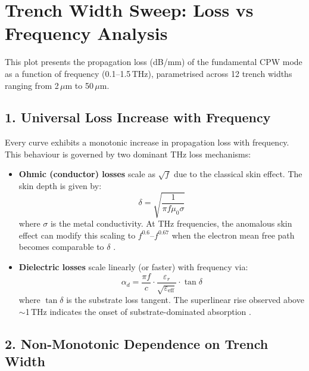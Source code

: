 
\section*{Trench Width Sweep: Loss vs Frequency Analysis}

This plot presents the propagation loss (dB/mm) of the fundamental CPW mode as a function of frequency (0.1--1.5\,THz), parametrised across 12 trench widths ranging from 2\,$\mu$m to 50\,$\mu$m.

\subsection*{1. Universal Loss Increase with Frequency}

Every curve exhibits a monotonic increase in propagation loss with frequency. This behaviour is governed by two dominant THz loss mechanisms:

\begin{itemize}
    \item \textbf{Ohmic (conductor) losses} scale as $\sqrt{f}$ due to the classical skin effect. The skin depth is given by:
    \begin{equation}
        \delta = \sqrt{\frac{1}{\pi f \mu_0 \sigma}}
    \end{equation}
    where $\sigma$ is the metal conductivity. At THz frequencies, the anomalous skin effect can modify this scaling to $f^{0.6}$--$f^{0.67}$ when the electron mean free path becomes comparable to $\delta$ \cite{kagoshima_anomalous}.

    \item \textbf{Dielectric losses} scale linearly (or faster) with frequency via:
    \begin{equation}
        \alpha_d = \frac{\pi f}{c} \cdot \frac{\varepsilon_r}{\sqrt{\varepsilon_{\mathrm{eff}}}} \cdot \tan\delta
    \end{equation}
    where $\tan\delta$ is the substrate loss tangent. The superlinear rise observed above $\sim$1\,THz indicates the onset of substrate-dominated absorption \cite{ucl_thz_substrates}.
\end{itemize}

\subsection*{2. Non-Monotonic Dependence on Trench Width}

